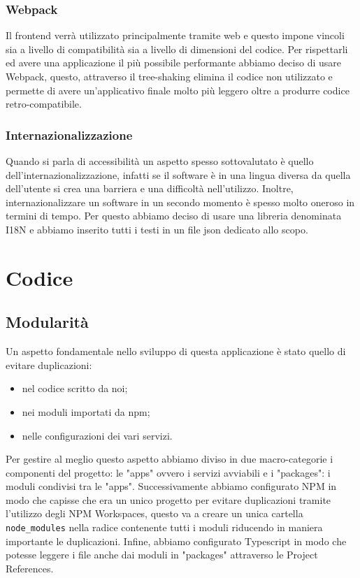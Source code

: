 \documentclass[italian]{report}
\begin{document}
\subsection{Webpack}
Il frontend verrà utilizzato principalmente tramite web e questo impone vincoli sia a livello di compatibilità sia a livello di dimensioni del codice. Per rispettarli ed avere una applicazione il più possibile performante abbiamo deciso di usare Webpack, questo, attraverso il tree-shaking elimina il codice non utilizzato e permette di avere un'applicativo finale molto più leggero oltre a produrre codice retro-compatibile.
\subsection{Internazionalizzazione}
Quando si parla di accessibilità un aspetto spesso sottovalutato è quello dell'internazionalizzazione, infatti se il software è in una lingua diversa da quella dell'utente si crea una barriera e una difficoltà nell'utilizzo. Inoltre, internazionalizzare un software in un secondo momento è spesso molto oneroso in termini di tempo. Per questo abbiamo deciso di usare una libreria denominata I18N e abbiamo inserito tutti i testi in un file json dedicato allo scopo.

\chapter{Codice}
\section{Modularità}
Un aspetto fondamentale nello sviluppo di questa applicazione è stato quello di evitare duplicazioni:
\begin{itemize}
    \item nel codice scritto da noi;
    \item nei moduli importati da npm;
    \item nelle configurazioni dei vari servizi.
\end{itemize}
Per gestire al meglio questo aspetto abbiamo diviso in due macro-categorie i componenti del progetto: le "apps" ovvero i servizi avviabili e i "packages": i moduli condivisi tra le "apps".
Successivamente abbiamo configurato NPM in modo che capisse che era un unico progetto per evitare duplicazioni tramite l'utilizzo degli NPM Workspaces, questo va a creare un unica cartella \lstinline{node_modules} nella radice contenente tutti i moduli riducendo in maniera importante le duplicazioni. 
Infine, abbiamo configurato Typescript in modo che potesse leggere i file anche dai moduli in "packages" attraverso le Project References.
\end{document}
